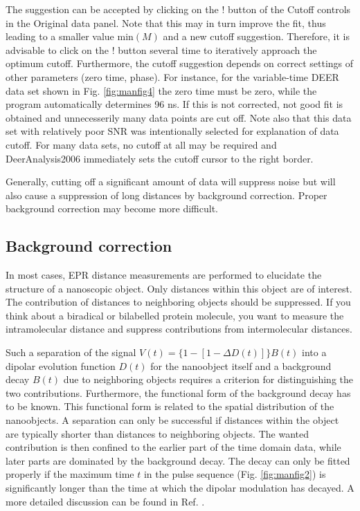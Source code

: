 \documentclass{article}
\begin{document}
The suggestion can be accepted by clicking on the {\ttfamily !} button of the {\ttfamily Cutoff} controls in the {\ttfamily Original data} panel. Note that this may in turn improve the fit, thus leading to a smaller value $\mathrm{min}(M)$ and a new cutoff suggestion. Therefore, it is advisable to click on the {\ttfamily !} button several time to iteratively approach the optimum cutoff. Furthermore, the cutoff suggestion depends on correct settings of other parameters (zero time, phase). For instance, for the variable-time DEER data set shown in Fig. \ref{fig:manfig4} the zero time must be zero, while the program automatically determines 96 ns. If this is not corrected, not good fit is obtained and unnecesserily many data points are cut off. Note also that this data set with relatively poor SNR was intentionally selected for explanation of data cutoff. For many data sets, no cutoff at all may be required and DeerAnalysis2006 immediately sets the cutoff cursor to the right border.

Generally, cutting off a significant amount of data will suppress noise but will also cause a suppression of long distances by background correction. Proper background correction may
become more difficult. 
 
\subsection{Background correction}
In most cases, EPR distance measurements are performed to elucidate the structure
of a nanoscopic object. Only distances within this object are of interest.
The contribution of distances to neighboring objects should be suppressed. If
you think about a biradical or bilabelled protein molecule, you want to measure
the intramolecular distance and suppress contributions from intermolecular
distances.

Such a separation of the signal $V(t)= \{ 1 - [1 - \Delta D(t)] \} B(t)$ into a dipolar evolution function $D(t)$ for the
nanoobject itself and a background decay $B(t)$ due to neighboring objects requires a
criterion for distinguishing the two contributions. Furthermore, the functional
form of the background decay has to be known. This functional form is related to
the spatial distribution of the nanoobjects. A separation can only be successful
if distances within the object are typically shorter than distances to neighboring
objects. The wanted contribution is then confined to the earlier part of the time domain
data, while later parts are dominated by the background decay. The
decay can only be fitted properly if the maximum time $t$ in the pulse sequence
(Fig. \ref{fig:manfig2}) is significantly longer than the time at which the dipolar modulation
has decayed. A more detailed discussion can be found in Ref. \cite{jeschke2004a}.
\end{document}
